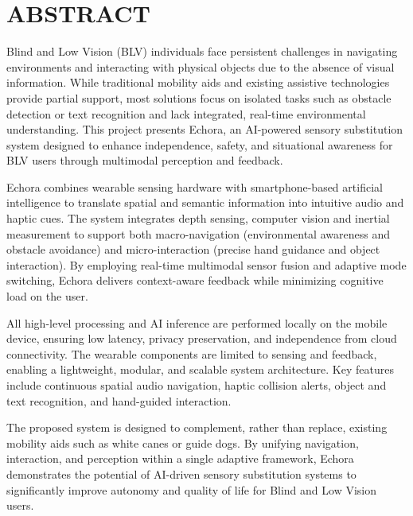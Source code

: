 \chapter*{ABSTRACT}
\thispagestyle{plain}

\vspace{0.5cm}

Blind and Low Vision (BLV) individuals face persistent challenges in navigating environments and interacting with physical objects due to the absence of visual information. While traditional mobility aids and existing assistive technologies provide partial support, most solutions focus on isolated tasks such as obstacle detection or text recognition and lack integrated, real-time environmental understanding. This project presents Echora, an AI-powered sensory substitution system designed to enhance independence, safety, and situational awareness for BLV users through multimodal perception and feedback.


Echora combines wearable sensing hardware with smartphone-based artificial intelligence to translate spatial and semantic information into intuitive audio and haptic cues. The system integrates depth sensing, computer vision and inertial measurement to support both macro-navigation (environmental awareness and obstacle avoidance) and micro-interaction (precise hand guidance and object interaction). By employing real-time multimodal sensor fusion and adaptive mode switching, Echora delivers context-aware feedback while minimizing cognitive load on the user.

All high-level processing and AI inference are performed locally on the mobile device, ensuring low latency, privacy preservation, and independence from cloud connectivity. The wearable components are limited to sensing and feedback, enabling a lightweight, modular, and scalable system architecture. Key features include continuous spatial audio navigation, haptic collision alerts, object and text recognition, and hand-guided interaction.

The proposed system is designed to complement, rather than replace, existing mobility aids such as white canes or guide dogs. By unifying navigation, interaction, and perception within a single adaptive framework, Echora demonstrates the potential of AI-driven sensory substitution systems to significantly improve autonomy and quality of life for Blind and Low Vision users.


